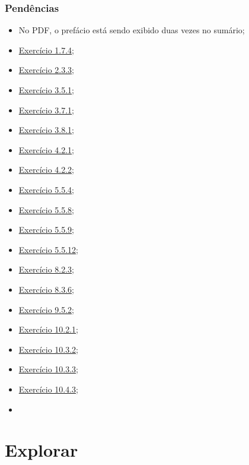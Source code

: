 \documentclass[
]{latex/krantz}
\providecommand{\tightlist}{%
  \setlength{\itemsep}{0pt}\setlength{\parskip}{0pt}}
\theoremstyle{definition}
\theoremstyle{definition}
\theoremstyle{definition}
\theoremstyle{definition}
\theoremstyle{remark}
\begin{document}
\hypertarget{penduxeancias}{%
\section*{Pendências}\label{penduxeancias}}

\begin{itemize}
\tightlist
\item
  No PDF, o prefácio está sendo exibido duas vezes no sumário;
\item
  \protect\hyperlink{exr1-7-4}{Exercício 1.7.4};
\item
  \protect\hyperlink{exr2-3-3}{Exercício 2.3.3};
\item
  \protect\hyperlink{exr3-5-1}{Exercício 3.5.1};
\item
  \protect\hyperlink{exr3-7-1}{Exercício 3.7.1};
\item
  \protect\hyperlink{exr3-8-1}{Exercício 3.8.1};
\item
  \protect\hyperlink{exr4-2-1}{Exercício 4.2.1};
\item
  \protect\hyperlink{exr4-2-2}{Exercício 4.2.2};
\item
  \protect\hyperlink{exr5-5-4}{Exercício 5.5.4};
\item
  \protect\hyperlink{exr5-5-8}{Exercício 5.5.8};
\item
  \protect\hyperlink{exr5-5-9}{Exercício 5.5.9};
\item
  \protect\hyperlink{exr5-5-12}{Exercício 5.5.12};
\item
  \protect\hyperlink{exr8-2-3}{Exercício 8.2.3};
\item
  \protect\hyperlink{exr8-3-6}{Exercício 8.3.6};
\item
  \protect\hyperlink{exr9-5-2}{Exercício 9.5.2};
\item
  \protect\hyperlink{exr10-2-1}{Exercício 10.2.1};
\item
  \protect\hyperlink{exr10-3-2}{Exercício 10.3.2};
\item
  \protect\hyperlink{exr10-3-3}{Exercício 10.3.3};
\item
  \protect\hyperlink{exr10-4-3}{Exercício 10.4.3};
\item
\end{itemize}

\mainmatter

\hypertarget{part-explorar}{%
\part{Explorar}\label{part-explorar}}
\end{document}
